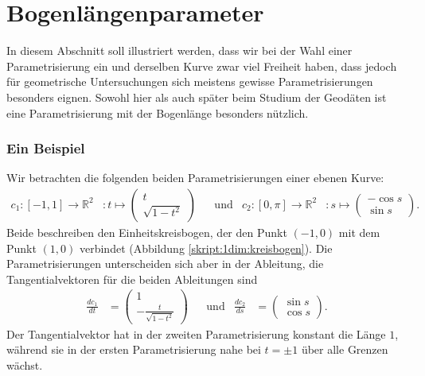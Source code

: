 \section{Bogenlängenparameter}
In diesem Abschnitt soll illustriert werden, dass wir bei der Wahl
einer Parametrisierung ein und derselben Kurve zwar viel Freiheit haben,
dass jedoch für geometrische Untersuchungen sich meistens gewisse
Parametrisierungen besonders eignen.
Sowohl hier als auch später beim Studium der Geodäten ist eine
Parametrisierung mit der Bogenlänge besonders nützlich.

\subsubsection{Ein Beispiel}
Wir betrachten die folgenden beiden Parametrisierungen einer ebenen Kurve:
\begin{equation}
\begin{aligned}
c_1\colon
[-1,1]\to\mathbb{R}^2
&\colon
t\mapsto\begin{pmatrix}t\\\sqrt{1-t^2}\end{pmatrix}
&&\text{und}&
c_2\colon
[0,\pi]\to\mathbb{R}^2
&
\colon
s\mapsto\begin{pmatrix}-\cos s\\\sin s\end{pmatrix}.
\end{aligned}
\end{equation}
Beide beschreiben den Einheitskreisbogen, der den Punkt $(-1,0)$ mit
dem Punkt $(1,0)$ verbindet (Abbildung \ref{skript:1dim:kreisbogen}).
Die Parametrisierungen unterscheiden sich aber in der Ableitung,
die Tangentialvektoren für die beiden Ableitungen sind
\begin{equation}
\begin{aligned}
\frac{dc_1}{dt}
&=
\begin{pmatrix}
1\\-\frac{t}{\sqrt{1-t^2}}
\end{pmatrix}
&&\text{und}&
\frac{dc_2}{ds}
&=
\begin{pmatrix}
\sin s\\\cos s
\end{pmatrix}.
\end{aligned}
\end{equation}
Der Tangentialvektor hat in der zweiten Parametrisierung konstant
die Länge $1$, während sie in der ersten Parametrisierung nahe bei
$t=\pm1$ über alle Grenzen wächst.
